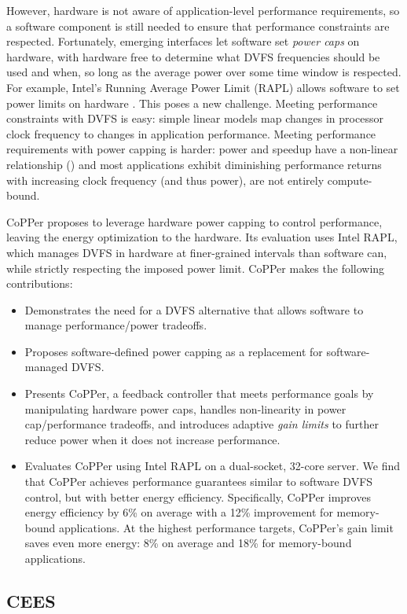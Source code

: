 However, hardware is not aware of application-level performance requirements, so a software component is still needed to ensure that performance constraints are respected.
Fortunately, emerging interfaces let software set \emph{power caps} on hardware, with hardware free to determine what DVFS frequencies should be used and when, so long as the average power over some time window is respected.
For example, Intel's Running Average Power Limit (RAPL) allows software to set power limits on hardware \cite{RAPL}.
This poses a new challenge.
Meeting performance constraints with DVFS is easy: simple linear models map changes in processor clock frequency to changes in application performance.
Meeting performance requirements with power capping is harder: power and speedup have a non-linear relationship () and most applications exhibit diminishing performance returns with increasing clock frequency (and thus power), \ie are not entirely compute-bound.

CoPPer proposes to leverage hardware power capping to control performance, leaving the energy optimization to the hardware.
Its evaluation uses Intel RAPL, which manages DVFS in hardware at finer-grained intervals than software can, while strictly respecting the imposed power limit.
CoPPer makes the following contributions:
\begin{itemize}
\item Demonstrates the need for a DVFS alternative that allows software to manage performance/power tradeoffs.
\item Proposes software-defined power capping as a replacement for software-managed DVFS.
\item Presents CoPPer, a feedback controller that meets performance goals by manipulating hardware power caps, handles non-linearity in power cap/performance tradeoffs, and introduces adaptive \emph{gain limits} to further reduce power when it does not increase performance.
\item Evaluates CoPPer using Intel RAPL on a dual-socket, 32-core server.
We find that CoPPer achieves performance guarantees similar to software DVFS control, but with better energy efficiency.
Specifically, CoPPer improves energy efficiency by 6\% on average with a 12\% improvement for memory-bound applications.
At the highest performance targets, CoPPer's gain limit saves even more energy: 8\% on average and 18\% for memory-bound applications.
\end{itemize}


\subsection{CEES}
\label{sec:intro-ee}

